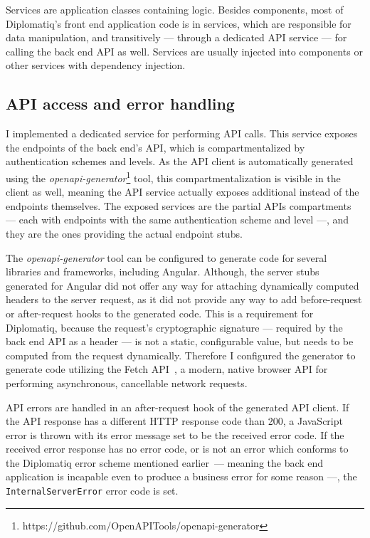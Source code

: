Services are application classes containing logic. Besides components, most of Diplomatiq's front end application code is in services, which are responsible for data manipulation, and transitively — through a dedicated API service — for calling the back end API as well. Services are usually injected into components or other services with dependency injection.

\subsection{API access and error handling}

I implemented a dedicated service for performing API calls. This service exposes the endpoints of the back end's API, which is compartmentalized by authentication schemes and levels. As the API client is automatically generated using the \emph{openapi-generator}\footnote{https://github.com/OpenAPITools/openapi-generator} tool, this compartmentalization is visible in the client as well, meaning the API service actually exposes additional  instead of the endpoints themselves. The exposed services are the partial APIs compartments — each with endpoints with the same authentication scheme and level —, and they are the ones providing the actual endpoint stubs.

The \emph{openapi-generator} tool can be configured to generate code for several libraries and frameworks, including Angular. Although, the server stubs generated for Angular did not offer any way for attaching dynamically computed headers to the server request, as it did not provide any way to add before-request or after-request hooks to the generated code. This is a requirement for Diplomatiq, because the request's cryptographic signature — required by the back end API as a header — is not a static, configurable value, but needs to be computed from the request dynamically. Therefore I configured the generator to generate code utilizing the Fetch API~\cite{fetchapi}, a modern, native browser API for performing asynchronous, cancellable network requests.

API errors are handled in an after-request hook of the generated API client. If the API response has a different HTTP response code than 200, a JavaScript error is thrown with its error message set to be the received error code. If the received error response has no error code, or is not an error which conforms to the Diplomatiq error scheme mentioned earlier — meaning the back end application is incapable even to produce a business error for some reason —, the \lstinline{InternalServerError} error code is set.

